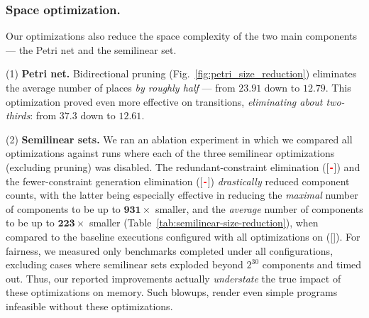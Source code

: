 \subsubsection{Space optimization.}
Our optimizations also reduce the space complexity of the two main components --- the Petri net and the semilinear set.

\noindent
(1) \textbf{Petri net.} Bidirectional pruning (Fig.~\ref{fig:petri_size_reduction}) 
eliminates the average number of places \textit{by roughly half} --- from $23.91$ down to $12.79$. This optimization proved even more effective on transitions, \textit{eliminating about two-thirds}: from $37.3$ down to $12.61$. 

\noindent
(2) \textbf{Semilinear sets.} We ran an ablation experiment in which we compared all optimizations against runs where each of the three semilinear optimizations (excluding pruning) was disabled. The redundant-constraint elimination ([\texttt{\textbf{\textcolor{red}{-}}}]) and the fewer-constraint generation elimination ([\texttt{\textbf{\textcolor{red}{-}}}]) \textit{drastically} reduced component counts, with the latter being especially effective in reducing the \textit{maximal} number of components to be up to $\mathbf{931\times}$ smaller, and the \textit{average} number of components to be up to $\mathbf{223\times}$ smaller (Table~\ref{tab:semilinear-size-reduction}), when compared to the baseline executions configured with all optimizations on ([\texttt{\textbf{}}]). 
%
For fairness, we measured only benchmarks completed under all configurations, excluding cases where semilinear sets exploded beyond $2^{30}$ components and timed out. Thus, our reported improvements actually \textit{understate} the true impact of these optimizations on memory. Such blowups, %
render even simple programs infeasible without these optimizations.
	
